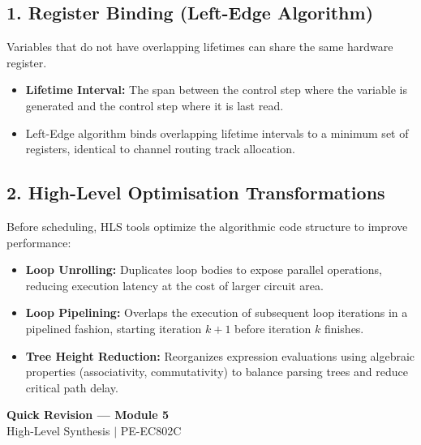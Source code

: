 \documentclass[12pt,a4paper]{article}
\begin{document}
\subsection{1. Register Binding (Left-Edge Algorithm)}
Variables that do not have overlapping lifetimes can share the same hardware register.
\begin{itemize}[leftmargin=*, itemsep=2pt]
  \item \textbf{Lifetime Interval:} The span between the control step where the variable is generated and the control step where it is last read.
  \item Left-Edge algorithm binds overlapping lifetime intervals to a minimum set of registers, identical to channel routing track allocation.
\end{itemize}

\subsection{2. High-Level Optimisation Transformations}
Before scheduling, HLS tools optimize the algorithmic code structure to improve performance:
\begin{itemize}[leftmargin=*, itemsep=2pt]
  \item \textbf{Loop Unrolling:} Duplicates loop bodies to expose parallel operations, reducing execution latency at the cost of larger circuit area.
  \item \textbf{Loop Pipelining:} Overlaps the execution of subsequent loop iterations in a pipelined fashion, starting iteration $k+1$ before iteration $k$ finishes.
  \item \textbf{Tree Height Reduction:} Reorganizes expression evaluations using algebraic properties (associativity, commutativity) to balance parsing trees and reduce critical path delay.
\end{itemize}

\newpage

\begin{center}
  {\large\bfseries\color{myred} Quick Revision — Module 5}\\[3pt]
  {\small\color{mydark} High-Level Synthesis $|$ PE-EC802C}
\end{center}
\noindent{\color{myred}\rule{\linewidth}{1.2pt}}
\vspace{8pt}
\end{document}
